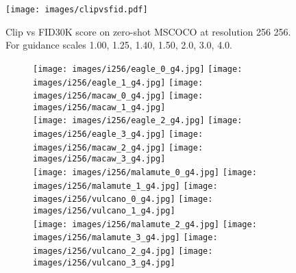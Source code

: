 \documentclass[nohyperref]{article}
\theoremstyle{plain}
\theoremstyle{definition}
\theoremstyle{remark}
\begin{document}
\begin{figure}[H]
    \centering
    \texttt{[image: images/clipvsfid.pdf]}
    \caption{Clip vs FID30K score on zero-shot MSCOCO at resolution 256  256. For guidance scales 1.00, 1.25, 1.40, 1.50, 2.0, 3.0, 4.0.}
    \label{fig:clipvsfid}
\end{figure}

\begin{figure}
\centering
\begin{subfigure}[b]{0.495\textwidth}
\centering
\texttt{[image: images/i256/eagle\_0\_g4.jpg]} \hspace{.04cm} \texttt{[image: images/i256/eagle\_1\_g4.jpg]} \hspace{.04cm}
    \texttt{[image: images/i256/macaw\_0\_g4.jpg]} \hspace{.04cm} \texttt{[image: images/i256/macaw\_1\_g4.jpg]} \\ \vspace{.17cm}
\texttt{[image: images/i256/eagle\_2\_g4.jpg]} \hspace{.04cm } \texttt{[image: images/i256/eagle\_3\_g4.jpg]} \hspace{.04cm}
    \texttt{[image: images/i256/macaw\_2\_g4.jpg]} \hspace{.04cm } \texttt{[image: images/i256/macaw\_3\_g4.jpg]} \\ \vspace{.17cm}
\texttt{[image: images/i256/malamute\_0\_g4.jpg]} \hspace{.04cm} \texttt{[image: images/i256/malamute\_1\_g4.jpg]} \hspace{.04cm}
    \texttt{[image: images/i256/vulcano\_0\_g4.jpg]} \hspace{.04cm} \texttt{[image: images/i256/vulcano\_1\_g4.jpg]} \\ \vspace{.17cm}
\texttt{[image: images/i256/malamute\_2\_g4.jpg]} \hspace{.04cm } \texttt{[image: images/i256/malamute\_3\_g4.jpg]} \hspace{.04cm}
    \texttt{[image: images/i256/vulcano\_2\_g4.jpg]} \hspace{.04cm } \texttt{[image: images/i256/vulcano\_3\_g4.jpg]} \\ \vspace{.17cm}

\end{subfigure}
\end{figure}
\end{document}
